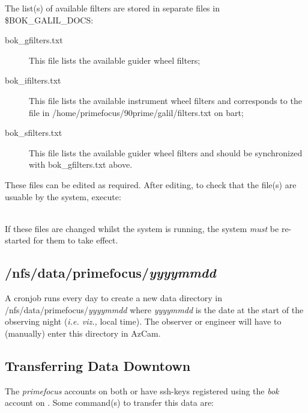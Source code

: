 \documentclass[12pt,twoside]{article}
\begin{document}
\noindent The list(s) of available filters are stored in separate files in \$BOK\_GALIL\_DOCS:

\begin{description}
 \item[bok\_gfilters.txt] This file lists the available guider wheel filters;
 \item[bok\_ifilters.txt] This file lists the available instrument wheel filters and corresponds to the file in
                          /home/primefocus/90prime/galil/filters.txt on {\sc bart};
 \item[bok\_sfilters.txt] This file lists the available guider wheel filters and should be synchronized with 
                          bok\_gfilters.txt above.
\end{description}

\noindent These files can be edited as required. After editing, to check that the file(s) are usuable by the system, execute: \\




 \\

\noindent If these files are changed whilst the system is running, the system \emph{must} be re-started for them to take effect.

\subsection{/nfs/data/primefocus/\emph{yyyymmdd}}
\label{datadirectory}

A cronjob runs every day to create a new data directory in /nfs/data/primefocus/\emph{yyyymmdd} where \emph{yyyymmdd} is
the date at the start of the observing night (\emph{i.e. viz.,} local time). The observer or engineer will have to (manually)
enter this directory in AzCam.

\subsection{Transferring Data Downtown}
\label{Transferring Data Downtown}

The \emph{primefocus} accounts on both  or  have ssh-keys registered using the \emph{bok}
account on . Some command(s) to transfer this data are: \\
 
\end{document}
